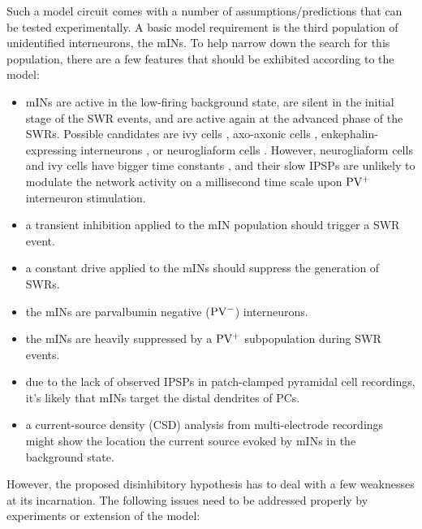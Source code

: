     Such a model circuit comes with a number of assumptions/predictions that can
    be tested experimentally. A basic model requirement is the third population
    of unidentified interneurons, the mINs. To help narrow down the search for
    this population, there are a few features that should be exhibited
    according to the model:

    \begin{itemize}
      \item mINs are active in the low-firing background state, are silent in
        the initial stage of the SWR events, and are active again at the
        advanced phase of the SWRs. Possible candidates are ivy cells
        \citep{Hajos2013}, axo-axonic cells \citep{Viney2013},
        enkephalin-expressing interneurons \citep{Fuentealba2008b}, or
        neurogliaform cells \citep{Karayannis2010}. However, neurogliaform
        cells and ivy cells have bigger time constants \citep{Fuentealba2008,
        Karayannis2010}, and their slow IPSPs are unlikely to modulate the
        network activity on a millisecond time scale upon $\rm PV^+$
        interneuron stimulation.
      \item a transient inhibition applied to the mIN population should trigger
        a SWR event.
      \item a constant drive applied to the mINs should suppress the generation
        of SWRs.
      \item the mINs are parvalbumin negative ($\rm PV^-$) interneurons.
      \item the mINs are heavily suppressed by a $\rm PV^+$ subpopulation during
        SWR events.
      \item due to the lack of observed IPSPs in patch-clamped pyramidal cell
        recordings, it's likely that mINs target the distal dendrites of PCs.
      \item a current-source density (CSD) analysis from multi-electrode
        recordings might show the location the current source evoked by mINs in
        the background state.
    \end{itemize} 

    However, the proposed disinhibitory hypothesis has to deal with a few
    weaknesses at its incarnation. The following issues need to be addressed
    properly by experiments or extension of the model:

